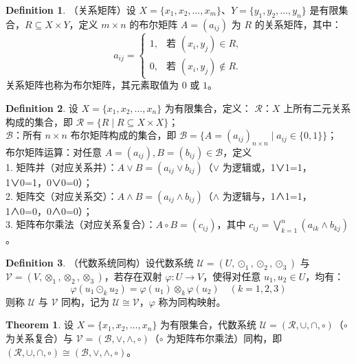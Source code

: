 \documentclass[oneside]{book}
\theoremstyle{definition}
\newtheorem{definition}{Definition}[section]
\newtheorem{theorem}{Theorem}[section]
\begin{document}
\begin{definition}
	（关系矩阵）设 \( X = \{ x_1, x_2, \dots, x_m \} \)、\( Y = \{ y_1, y_2, \dots, y_n \} \) 是有限集合，\( R \subseteq X \times Y \)，定义 \( m \times n \) 的布尔矩阵 \( A = (a_{ij}) \) 为 \( R \) 的关系矩阵，其中：
	\[
	a_{ij} = 
	\begin{cases} 
		1, & \text{若 } (x_i, y_j) \in R, \\
		0, & \text{若 } (x_i, y_j) \notin R.
	\end{cases}
	\]
	关系矩阵也称为布尔矩阵，其元素取值为 \( 0 \) 或 \( 1 \)。
\end{definition}
\begin{definition}
	设 \( X = \{x_1, x_2, \dots, x_n\} \) 为有限集合，定义：
	 \( \mathcal{R} \)：\( X \) 上所有二元关系构成的集合，即 \( \mathcal{R} = \{ R \mid R \subseteq X \times X \} \)；\\
	 \( \mathcal{B} \)：所有 \( n \times n \) 布尔矩阵构成的集合，即 \( \mathcal{B} = \{ A = (a_{ij})_{n \times n} \mid a_{ij} \in \{0,1\} \} \)；\\
	 布尔矩阵运算：对任意 \( A = (a_{ij}), B = (b_{ij}) \in \mathcal{B} \)，定义\\
	1. 矩阵并（对应关系并）：\( A \vee B = (a_{ij} \vee b_{ij}) \)（\( \vee \) 为逻辑或，1∨1=1，1∨0=1，0∨0=0）；\\
	2. 矩阵交（对应关系交）：\( A \wedge B = (a_{ij} \wedge b_{ij}) \)（\( \wedge \) 为逻辑与，1∧1=1，1∧0=0，0∧0=0）；\\
	3. 矩阵布尔乘法（对应关系复合）：\( A \circ B = (c_{ij}) \)，其中 \( c_{ij} = \bigvee_{k=1}^n (a_{ik} \wedge b_{kj}) \)。
\end{definition}


\begin{definition}
	（代数系统同构）设代数系统 \( \mathcal{U} = (U, \odot_1, \odot_2, \odot_3) \) 与 \( \mathcal{V} = (V, \otimes_1, \otimes_2, \otimes_3) \)，若存在双射 \( \varphi: U \to V \)，使得对任意 \( u_1, u_2 \in U \)，均有：
	\[
	\varphi(u_1 \odot_k u_2) = \varphi(u_1) \otimes_k \varphi(u_2) \quad (k=1,2,3)
	\]
	则称 \( \mathcal{U} \) 与 \( \mathcal{V} \) 同构，记为 \( \mathcal{U} \cong \mathcal{V} \)，\( \varphi \) 称为同构映射。
\end{definition}


\begin{theorem}
	设 \( X = \{x_1, x_2, \dots, x_n\} \) 为有限集合，代数系统 \( \mathcal{U} = (\mathcal{R}, \cup, \cap, \circ) \)（\( \circ \) 为关系复合）与 \( \mathcal{V} = (\mathcal{B}, \vee, \wedge, \circ) \)（\( \circ \) 为矩阵布尔乘法）同构，即 \( (\mathcal{R}, \cup, \cap, \circ) \cong (\mathcal{B}, \vee, \wedge, \circ) \)。
\end{theorem}
\end{document}

